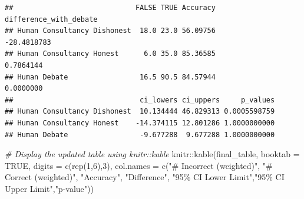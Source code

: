 \documentclass[
]{article}
\newenvironment{Shaded}{\begin{snugshade}}{\end{snugshade}}
\newcommand{\AttributeTok}[1]{\textcolor[rgb]{0.77,0.63,0.00}{#1}}
\newcommand{\CommentTok}[1]{\textcolor[rgb]{0.56,0.35,0.01}{\textit{#1}}}
\newcommand{\ConstantTok}[1]{\textcolor[rgb]{0.00,0.00,0.00}{#1}}
\newcommand{\DecValTok}[1]{\textcolor[rgb]{0.00,0.00,0.81}{#1}}
\newcommand{\FunctionTok}[1]{\textcolor[rgb]{0.00,0.00,0.00}{#1}}
\newcommand{\NormalTok}[1]{#1}
\newcommand{\OtherTok}[1]{\textcolor[rgb]{0.56,0.35,0.01}{#1}}
\newcommand{\SpecialCharTok}[1]{\textcolor[rgb]{0.00,0.00,0.00}{#1}}
\newcommand{\StringTok}[1]{\textcolor[rgb]{0.31,0.60,0.02}{#1}}
\begin{document}
\begin{Shaded}
\end{Shaded}

\begin{verbatim}
##                             FALSE TRUE Accuracy difference_with_debate
## Human Consultancy Dishonest  18.0 23.0 56.09756            -28.4818783
## Human Consultancy Honest      6.0 35.0 85.36585              0.7864144
## Human Debate                 16.5 90.5 84.57944              0.0000000
##                              ci_lowers ci_uppers     p_values
## Human Consultancy Dishonest  10.134444 46.829313 0.0005598759
## Human Consultancy Honest    -14.374115 12.801286 1.0000000000
## Human Debate                 -9.677288  9.677288 1.0000000000
\end{verbatim}

\begin{Shaded}
\begin{Highlighting}[]
\CommentTok{\# Display the updated table using knitr::kable}
\NormalTok{knitr}\SpecialCharTok{::}\FunctionTok{kable}\NormalTok{(final\_table, }\AttributeTok{booktab =} \ConstantTok{TRUE}\NormalTok{,  }\AttributeTok{digits =} \FunctionTok{c}\NormalTok{(}\FunctionTok{rep}\NormalTok{(}\DecValTok{1}\NormalTok{,}\DecValTok{6}\NormalTok{),}\DecValTok{3}\NormalTok{),}
             \AttributeTok{col.names =} \FunctionTok{c}\NormalTok{(}\StringTok{"\# Incorrect (weighted)"}\NormalTok{, }\StringTok{"\# Correct (weighted)"}\NormalTok{, }\StringTok{"Accuracy"}\NormalTok{, }\StringTok{"Difference"}\NormalTok{, }\StringTok{"95\% CI Lower Limit"}\NormalTok{,}\StringTok{"95\% CI Upper Limit"}\NormalTok{,}\StringTok{"p{-}value"}\NormalTok{))}
\end{Highlighting}
\end{Shaded}
\end{document}

